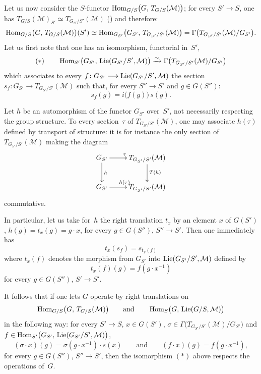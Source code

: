 \label{II.4.1.2.0}
{\renewcommand{\thefootnote}{(52)}}
Let us now consider the \(S\)-functor
\(\operatorname{Hom}_{G/S}\bigl(G,\,T_{G/S}(\mathcal{M})\bigr)\); for every \(S'\to S\),
one has
\(T_{G/S}(\mathcal{M})_{S'}\simeq T_{G_{S'}/S'}(\mathcal{M})\) () and
therefore:
\[
\operatorname{Hom}_{G/S}\bigl(G,\,T_{G/S}(\mathcal{M})\bigr)(S')
  \simeq
\operatorname{Hom}_{G_{S'}}\bigl(G_{S'},\,T_{G_{S'}/S'}(\mathcal{M})\bigr)
  =\Gamma\bigl(T_{G_{S'}/S'}(\mathcal{M})/G_{S'}\bigr).
\]
Let us first note that one has an isomorphism, functorial in~\(S'\),
\begin{equation*}
(*)\qquad
\operatorname{Hom}_{S'}\bigl(G_{S'},\,\operatorname{Lie}(G_{S'}/S',\mathcal{M})\bigr)
  \xrightarrow{\sim}
\Gamma\bigl(T_{G_{S'}/S'}(\mathcal{M})/G_{S'}\bigr)
\end{equation*}
which associates to every
\(f\colon G_{S'}\longrightarrow\operatorname{Lie}(G_{S'}/S',\mathcal{M})\) the section
\(s_{f}\colon G_{S'}\to T_{G_{S'}/S'}(\mathcal{M})\) such that, for every
\(S''\to S'\) and \(g\in G(S'')\):
\[
s_{f}(g)=i\bigl(f(g)\bigr)\,s(g).
\]

Let \(h\) be an automorphism of the functor \(G_{S'}\) over~\(S'\), not
necessarily respecting the group structure. To every section~\(\tau\) of
\(T_{G_{S'}/S'}(\mathcal{M})\), one may associate \(h(\tau)\) defined by
transport of structure: it is for instance the only section of
\(T_{G_{S'}/S'}(\mathcal{M})\) making the diagram
\[
\xymatrix{
G_{S'} \ar[r]^{\tau} \ar[d]^{h}
  & T_{G_{S'}/S'}(\mathcal{M}) \ar[d]^{T(h)} \\
G_{S'} \ar[r]^{h(\tau)}
  & T_{G_{S'}/S'}(\mathcal{M})
}
\]
commutative.

In particular, let us take for~\(h\) the right translation \(t_{x}\) by an
element \(x\) of \(G(S')\), \ie \(h(g)=t_{x}(g)=g\cdot x\), for every
\(g\in G(S'')\), \(S''\to S'\). Then one immediately has
\[
t_{x}(s_{f})=s_{t_{x}(f)}
\]
where \(t_{x}(f)\) denotes the morphism from \(G_{S'}\) into
\(\operatorname{Lie}(G_{S'}/S',\mathcal{M})\) defined by
\[
t_{x}(f)(g)=f(g\cdot x^{-1})
\]
for every \(g\in G(S'')\), \(S'\to S'\).

It follows that if one lets \(G\) operate by right translations on
\[
\operatorname{Hom}_{G/S}\bigl(G,\,T_{G/S}(\mathcal{M})\bigr)
  \qquad\text{and}\qquad
\operatorname{Hom}_{S}\bigl(G,\,\operatorname{Lie}(G/S,\mathcal{M})\bigr)
\]
in the following way: for every \(S'\to S\), \(x\in G(S')\),
\(\sigma\in\Gamma\bigl(T_{G_{S'}/S'}(\mathcal{M})/G_{S'}\bigr)\) and
\(f\in\operatorname{Hom}_{S'}\bigl(G_{S'},\,\operatorname{Lie}(G_{S'}/S',\mathcal{M})\bigr)\),
\[
(\sigma\cdot x)(g)=\sigma(g\cdot x^{-1})\cdot s(x)
  \qquad\text{and}\qquad
(f\cdot x)(g)=f(g\cdot x^{-1}),
\]
for every \(g\in G(S'')\), \(S''\to S'\), then the isomorphism \((*)\) above
respects the operations of~\(G\).


